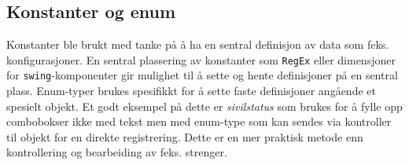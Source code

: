 \subsection{Konstanter og enum}
Konstanter ble brukt med tanke på å ha en sentral definisjon av data som feks. konfigurasjoner. En sentral plassering av konstanter som \texttt{RegEx} eller dimensjoner for \texttt{swing}-komponenter gir mulighet til å sette og hente definisjoner på en sentral plass. Enum-typer brukes spesifikkt for å sette faste definisjoner angående et spesielt objekt. Et godt eksempel på dette er \textit{sivilstatus} som brukes for å fylle opp combobokser ikke med tekst men med enum-type som kan sendes via kontroller til objekt for en direkte registrering. Dette er en mer praktisk metode enn kontrollering og bearbeiding av feks. strenger.    